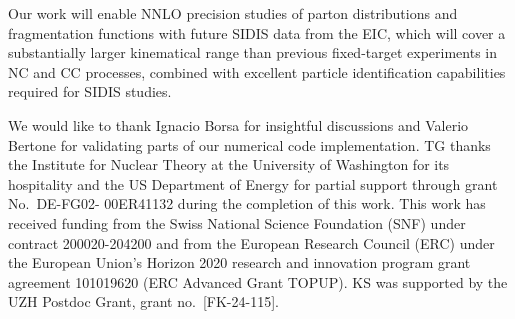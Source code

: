 \documentclass[11pt,a4paper]{article}
\begin{document}
Our work will enable NNLO precision studies of parton distributions and fragmentation functions with
future SIDIS data from the EIC, which will cover a substantially larger kinematical range than previous
fixed-target experiments in NC and CC processes, combined with excellent particle identification
capabilities required for SIDIS studies.



\acknowledgments

We would like to thank Ignacio Borsa for insightful discussions and
Valerio Bertone for validating parts of our numerical code implementation.
TG thanks the Institute for Nuclear Theory at the University of Washington for its
hospitality and the US Department of Energy for partial support through grant No.\ DE-FG02- 00ER41132
during the completion of this work.
This work has received funding from the Swiss National Science Foundation (SNF) under contract 200020-204200 and from the European Research Council (ERC) under the European Union’s Horizon 2020 research and innovation program grant agreement 101019620 (ERC Advanced Grant TOPUP).
KS was supported by the UZH Postdoc Grant, grant no.~[FK-24-115].

\newpage


\end{document}
